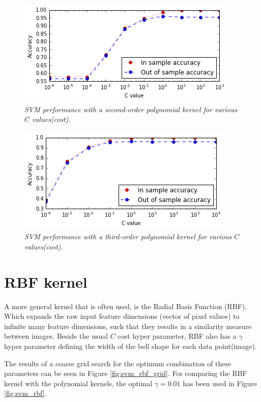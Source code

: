 \documentclass[a4paper,10pt,article,oneside,english]{memoir}
\let\oldcaption\caption
\renewcommand{\caption}[1]{\oldcaption{\emph{#1}}}
\begin{document}
	\begin{figure}[h!]
		\centering
		\includegraphics[width=0.7\linewidth]{svm_poly2.PNG}
		\caption{SVM performance with a second-order polynomial kernel for various $C$ values(cost).}
		\label{fig:svm_poly2}
	\end{figure}
	
	\begin{figure}[h!]
		\centering
		\includegraphics[width=0.7\linewidth]{svm_poly3.PNG}
		\caption{SVM performance with a third-order polynomial kernel for various $C$ values(cost).}
		\label{fig:svm_poly3}
	\end{figure}
	
	
	
	
	
	
	
	
	\section{RBF kernel}
	A more general kernel that is often used, is the Radial Basis Function (RBF).
	Which expands the raw input feature dimensions (vector of pixel values) to infinite many feature dimensions, such that they results in a similarity measure between images. Beside the usual $C$ cost hyper parameter, RBF also has a $\gamma$ hyper parameter defining the width of the bell shape for each data point(image).
	
	
	The results of a coarse grid search for the optimum combination of these parameters can be seen in Figure \ref{fig:svm_rbf_grid}. 
	For comparing the RBF kernel with the polynomial kernels, the optimal $\gamma=0.01$ has been used in Figure \ref{fig:svm_rbf}.
	
\end{document}
